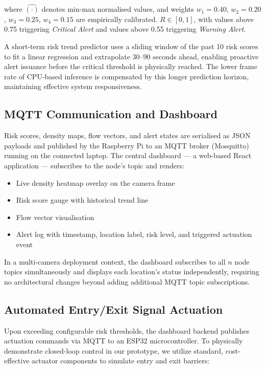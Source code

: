 \documentclass[12pt,a4paper]{article}
\begin{document}
where $\hat{(\cdot)}$ denotes min-max normalised values, and weights $w_1 = 0.40$, $w_2 = 0.20$, $w_3 = 0.25$, $w_4 = 0.15$ are empirically calibrated. $R \in [0, 1]$, with values above 0.75 triggering \textit{Critical Alert} and values above 0.55 triggering \textit{Warning Alert}.

A short-term risk trend predictor uses a sliding window of the past 10 risk scores to fit a linear regression and extrapolate 30--90 seconds ahead, enabling proactive alert issuance before the critical threshold is physically reached. The lower frame rate of CPU-based inference is compensated by this longer prediction horizon, maintaining effective system responsiveness.

\subsection{MQTT Communication and Dashboard}

Risk scores, density maps, flow vectors, and alert states are serialised as JSON payloads and published by the Raspberry Pi to an MQTT broker (Mosquitto) running on the connected laptop. The central dashboard — a web-based React application — subscribes to the node's topic and renders:

\begin{itemize}[leftmargin=1.5em, itemsep=3pt]
  \item Live density heatmap overlay on the camera frame
  \item Risk score gauge with historical trend line
  \item Flow vector visualisation
  \item Alert log with timestamp, location label, risk level, and triggered actuation event
\end{itemize}

In a multi-camera deployment context, the dashboard subscribes to all $n$ node topics simultaneously and displays each location's status independently, requiring no architectural changes beyond adding additional MQTT topic subscriptions.

\subsection{Automated Entry/Exit Signal Actuation}

Upon exceeding configurable risk thresholds, the dashboard backend publishes actuation commands via MQTT to an ESP32 microcontroller. To physically demonstrate closed-loop control in our prototype, we utilize standard, cost-effective actuator components to simulate entry and exit barriers:
\end{document}
